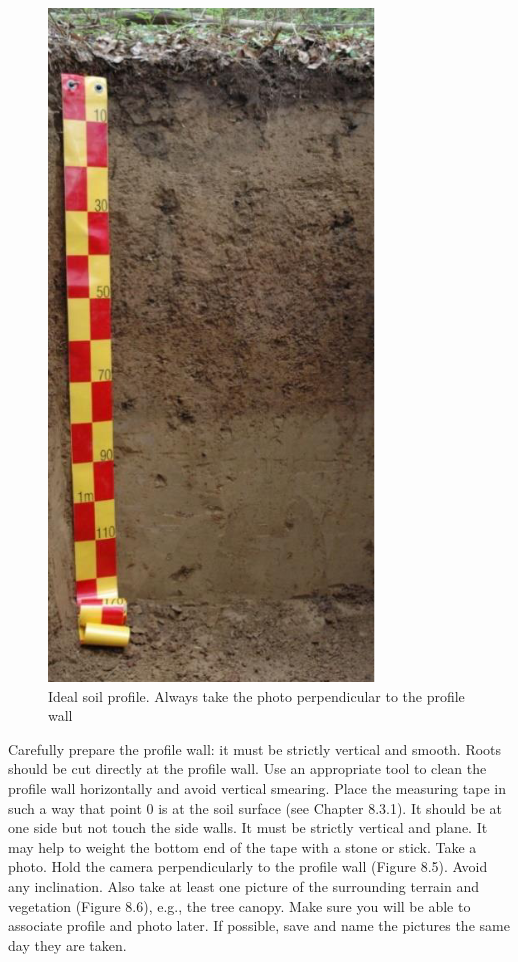 \documentclass[
  letterpaper,
  DIV=11,
  numbers=noendperiod]{scrreprt}
\begin{document}
\begin{figure}

{\centering \includegraphics{./figure_8-5.png}

}

\caption{Ideal soil profile. Always take the photo perpendicular to the
profile wall}

\end{figure}

Carefully prepare the profile wall: it must be strictly vertical and
smooth. Roots should be cut directly at the profile wall. Use an
appropriate tool to clean the profile wall horizontally and avoid
vertical smearing. Place the measuring tape in such a way that point 0
is at the soil surface (see Chapter 8.3.1). It should be at one side but
not touch the side walls. It must be strictly vertical and plane. It may
help to weight the bottom end of the tape with a stone or stick. Take a
photo. Hold the camera perpendicularly to the profile wall (Figure 8.5).
Avoid any inclination. Also take at least one picture of the surrounding
terrain and vegetation (Figure 8.6), e.g., the tree canopy. Make sure
you will be able to associate profile and photo later. If possible, save
and name the pictures the same day they are taken.
\end{document}

